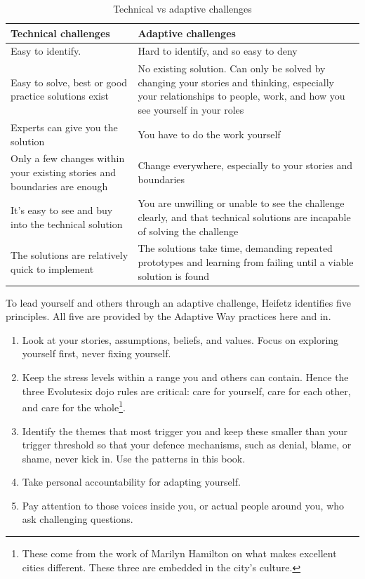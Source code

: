 \begin{table}[htb]
\bgroup 
\def\arraystretch{1.5}%
\begin{tabular}{p{} p{}}
\toprule
\textbf {Technical challenges} & \textbf {Adaptive challenges} \\
\midrule
Easy to identify. & Hard to identify, and so easy to deny \\
Easy to solve, best or good practice solutions exist & No existing solution. Can only be solved by changing your stories and thinking, especially your relationships to people, work, and how you see yourself in your roles \\
Experts can give you the solution & You have to do the work yourself \\
Only a few changes within your existing stories and boundaries are enough & Change everywhere, especially to your stories and boundaries \\
It's easy to see and buy into the technical solution & You are unwilling or unable to see the challenge clearly, and that technical solutions are incapable of solving the challenge \\
The solutions are relatively quick to implement & The solutions take time, demanding repeated prototypes and learning from failing until a viable solution is found \\
\bottomrule
\end{tabular}
\egroup
\caption{Technical vs adaptive challenges} \label{table:challenge-technical-vs-adaptive}
\end{table}


To lead yourself and others through an adaptive challenge, Heifetz  identifies five principles. All five are provided by the Adaptive Way practices here and in\cite{boyd-regenerate}.


\begin{enumerate}
\item Look at your stories, assumptions, beliefs, and values. Focus on exploring yourself first, never fixing yourself.
\item Keep the stress levels within a range you and others can contain. Hence the three Evolutesix  dojo rules are critical: care for yourself, care for each other, and care for the whole\footnote{These come from the work of Marilyn Hamilton  on what makes excellent cities different\cite{hamilton-integral-city}. These three are embedded in the city’s culture.}.
\item Identify the themes that most trigger you and keep these smaller than your trigger threshold so that your defence mechanisms, such as denial, blame, or shame, never kick in. Use the patterns in this book.
\item Take personal accountability for adapting yourself.
\item Pay attention to those voices inside you, or actual people around you, who ask challenging questions.        
\end{enumerate}


